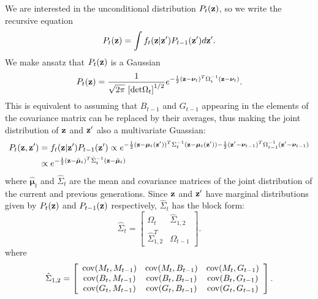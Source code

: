 \documentclass{article}
\newcommand{\bz}{{\bf z}}
\newcommand{\bmu}{{\boldsymbol \mu}}
\newcommand{\bnu}{{\boldsymbol \nu}}
\begin{document}
We are interested in the unconditional distribution $P_t(\bz)$, so we write the recursive equation
\begin{equation}
P_t(\bz) = \int f_t(\bz|\bz')P_{t-1}(\bz') d\bz'.
\end{equation}
We make ansatz that $P_t(\bz)$ is a Gaussian 
\begin{equation}
P_t(\bz) = \frac{1}{\sqrt{2\pi }\, \left[{\rm det}\Omega_{t}\right]^{1/2}} e^{-\frac{1}{2}(\bz-\bnu_{t})^T\Omega_{t}^{-1}(\bz-\bnu_{t})}.
\end{equation}
This is equivalent to assuming that $B_{t-1}$ and $G_{t-1}$ appearing in the elements of the covariance matrix can be replaced by their averages, thus making the joint distribution of $\bz$ and $\bz'$ also a multivariate Guassian:
\begin{align}
P_t(\bz,\bz') &= f_t(\bz|\bz')P_{t-1}(\bz') \propto e^{-\frac{1}{2}(\bz-\bmu_{t}(\bz'))^T\Sigma_{t}^{-1}(\bz-\bmu_{t}(\bz'))-\frac{1}{2}(\bz'-\bnu_{t-1})^T\Omega_{t-1}^{-1}(\bz'-\bnu_{t-1})}\\
&\propto e^{-\frac{1}{2}(\bz-\hat{\bmu}_t)^T\hat{\Sigma}_{t}^{-1}(\bz-\hat{\bmu}_{t})}
\end{align} 
where $\hat{\bmu}_t$ and $\hat{\Sigma}_{t}$ are the mean and covariance matrices of the joint distribution of the current and previous generations. 
Since $\bz$ and $\bz'$ have marginal distributions given by  $P_{t}(\bz)$ and $P_{t-1}(\bz)$ respectively, $\hat{\Sigma}_{t}$ has the block form:
\begin{equation}
\hat{\Sigma}_{t} = \left[ \begin{array}{cc}
\Omega_t  &\hat{\Sigma}_{1,2}\\
\hat{\Sigma}_{1,2}^T  &\Omega_{t-1} 
\end{array}\right].
\end{equation}
where 
\begin{equation}
\hat{\Sigma}_{1,2} =\left[ \begin{array}{ccc}
{\rm cov}(M_t,M_{t-1})  &{\rm cov}(M_t,B_{t-1})  &{\rm cov}(M_t,G_{t-1}) \\
{\rm cov}(B_t,M_{t-1})  &{\rm cov}(B_t,B_{t-1})  &{\rm cov}(B_t,G_{t-1}) \\
{\rm cov}(G_t,M_{t-1})  &{\rm cov}(G_t,B_{t-1})  &{\rm cov}(G_t,G_{t-1}) 
\end{array}\right].
\end{equation}
\end{document}
